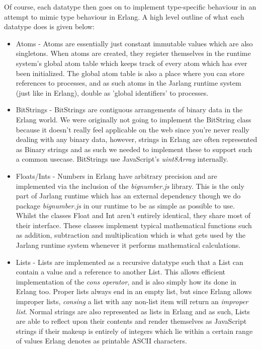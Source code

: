 \documentclass[twoside,12pt,titlepage,a4paper]{article}
\begin{document}
Of course, each datatype then goes on to implement type-specific behaviour in an attempt to mimic type behaviour in Erlang. A high level outline of what each datatype does is given below:

\begin{itemize}
\item Atoms - Atoms are essentially just constant immutable values which are also singletons. When atoms are created, they register themselves in the runtime system's global atom table which keeps track of every atom which has ever been initialized. The global atom table is also a place where you can store references to processes, and as such atoms in the Jarlang runtime system (just like in Erlang), double as 'global identifiers' to processes.

\item BitStrings - BitStrings are contiguous arrangements of binary data in the Erlang world. We were originally not going to implement the BitString class because it doesn't really feel applicable on the web since you're never really dealing with any binary data, however, strings in Erlang are often represented as Binary strings and as such we needed to implement these to support such a common usecase. BitStrings use JavaScript's \textit{uint8Array} internally.

\item Floats/Ints - Numbers in Erlang have arbitrary precision and are implemented via the inclusion of the \textit{bignumber.js} library. This is the only part of Jarlang runtime which has an external dependency though we do package \textit{bignumber.js} in our runtime to be as simple as possible to use. Whilst the classes Float and Int aren't entirely identical, they share most of their interface. These classes implement typical mathematical functions such as addition, subtraction and multiplication which is what gets used by the Jarlang runtime system whenever it performs mathematical calculations.

\item Lists - Lists are implemented as a recursive datatype such that a List can contain a value and a reference to another List. This allows efficient implementation of the \textit{cons operator}, and is also simply how its done in Erlang too. Proper lists always end in an empty list, but since Erlang allows improper lists, \textit{consing} a list with any non-list item will return an \textit{improper list}. Normal strings are also represented as lists in Erlang and as such, Lists are able to reflect upon their contents and render themselves as JavaScript strings if their makeup is entirely of integers which lie within a certain range of values Erlang denotes as printable ASCII characters.


\end{itemize}
\end{document}

